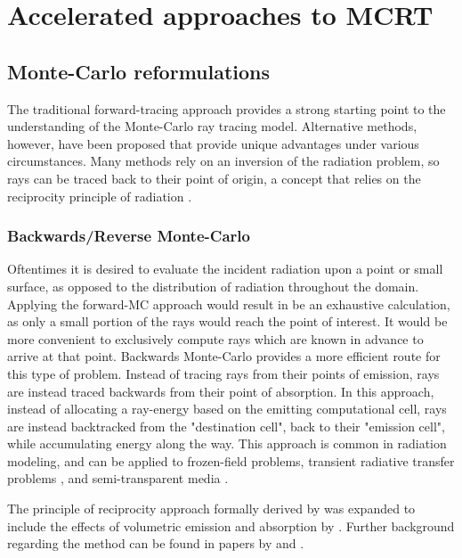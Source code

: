 \section{Accelerated approaches to MCRT}

\subsection{Monte-Carlo reformulations}
The traditional forward-tracing approach provides a strong starting point to the understanding of the Monte-Carlo ray tracing model. Alternative methods, however, have been proposed that provide unique advantages under various circumstances.
Many methods rely on an inversion of the radiation problem, so rays can be traced back to their point of origin, a concept that relies on the reciprocity principle of radiation \cite{Case1957TransferPrinciple}.

\subsubsection{Backwards/Reverse Monte-Carlo}
Oftentimes it is desired to evaluate the incident radiation upon a point or small surface, as opposed to the distribution of radiation throughout the domain.
Applying the forward-MC approach would result in be an exhaustive calculation, as only a small portion of the rays would reach the point of interest. It would be more convenient to exclusively compute rays which are known in advance to arrive at that point. 
Backwards Monte-Carlo provides a more efficient route for this type of problem.
Instead of tracing rays from their points of emission, rays are instead traced backwards from their point of absorption.
In this approach, instead of allocating a ray-energy based on the emitting computational cell, rays are instead backtracked from the "destination cell", back to their "emission cell", while accumulating energy along the way.
This approach is common in radiation modeling, and can be applied to frozen-field problems, transient radiative transfer problems \cite{Lu2004ReverseMedia}, and semi-transparent media \cite{Li2005BackwardSlab}.

The principle of reciprocity approach formally derived by \citet{Case1957TransferPrinciple} was expanded to include the effects of volumetric emission and absorption by \citet{Walters1992RigorousMedia}.
Further background regarding the method can be found in papers by \citet{Modest2003BackwardTransfer} and \citet{Howell2010ThermalTransfer}.


